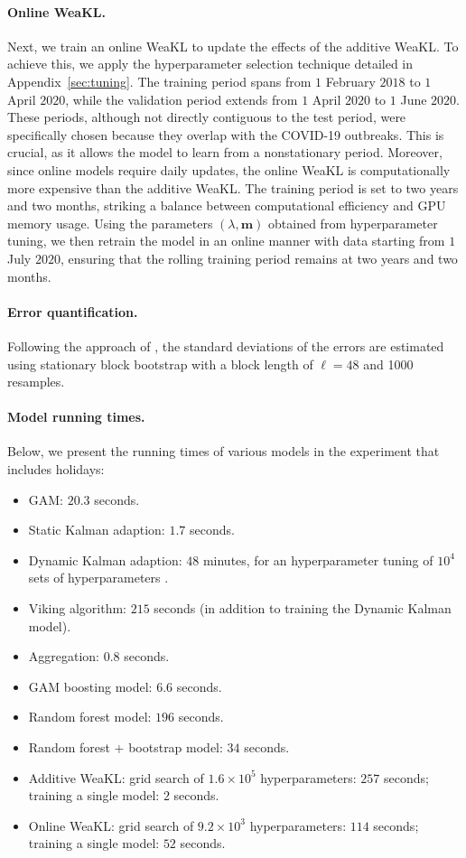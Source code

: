 \paragraph{Online WeaKL.} Next, we train an online WeaKL to update the effects of the additive WeaKL. To achieve this, we apply the hyperparameter selection technique detailed in Appendix~\ref{sec:tuning}. The training period spans from $1$ February $2018$ to $1$ April $2020$, while the validation period extends from $1$ April $2020$ to $1$ June $2020$. These periods, although not directly contiguous to the test period, were specifically chosen because they overlap with the COVID-19 outbreaks. This is crucial, as it allows the model to learn from a nonstationary period. Moreover, since online models require daily updates, the online WeaKL is computationally more expensive than the additive WeaKL. The training period is set to two years and two months, striking a balance between computational efficiency and GPU memory usage. Using the parameters $(\lambda, \mathbf m)$ obtained from hyperparameter tuning, we then retrain the model in an online manner with data starting from $1$ July $2020$, ensuring that the rolling training period remains at two years and two months.

\paragraph{Error quantification.} Following the approach of \citet{doumeche2023human}, the standard deviations of the errors are estimated using stationary block bootstrap with a block length of $\ell = 48$ and 1000 resamples.

\paragraph{Model running times.} Below, we present the running times of various models in the experiment that includes holidays:
\begin{itemize}
\item  GAM: $20.3$ seconds. 
\item Static Kalman adaption: $1.7$ seconds.
\item Dynamic Kalman adaption: $48$ minutes, for an hyperparameter tuning of $10^4$ sets of hyperparameters \citep[see][II.A.2]{obst2021adaptive}.
\item Viking algorithm: $215$ seconds (in addition to training the Dynamic Kalman model).
\item Aggregation: $0.8$ seconds.
\item GAM boosting model: $6.6$ seconds.
\item Random forest model: $196$ seconds.
\item Random forest + bootstrap model: $34$ seconds.
\item Additive WeaKL: grid search of $1.6\times 10^5$ hyperparameters: $257$ seconds; training a single model: $2$ seconds.
\item Online WeaKL: grid search of $9.2\times 10^3$ hyperparameters: $114$ seconds; training a single model: $52$ seconds.
\end{itemize}
